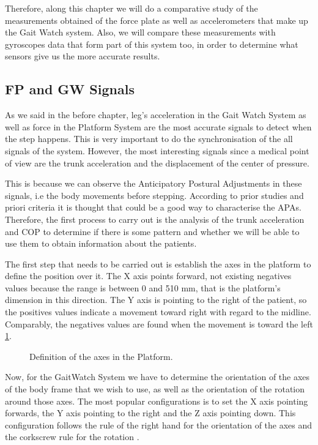 Therefore, along this chapter we will do a comparative study of the measurements obtained of the force plate as well as accelerometers that make up the Gait Watch system. Also, we will compare these measurements with gyroscopes data that form part of this system too, in order to determine what sensors give us the more accurate results.

\subsection{FP and GW Signals}
As we said in the before chapter, leg's acceleration in the Gait Watch System as well as force in the Platform System are the most accurate signals to detect when the step happens. This is very important to do the synchronisation of the all signals of the system. However, the most interesting signals since a medical point of view are the trunk acceleration and the displacement of the center of pressure.

This is because we can observe the Anticipatory Postural Adjustments in these signals, i.e the body movements before stepping. According to prior studies and priori criteria it is thought that could be a good way to characterise the APAs.
Therefore, the first process to carry out is the analysis of the trunk acceleration and COP to determine if there is some pattern and whether we will be able to use them to obtain information about the patients.

The first step that needs to be carried out is establish the axes in the platform to define the position over it. The X axis points forward, not existing negatives values because the range is between 0 and 510 mm, that is the platform’s dimension in this direction. The Y axis is pointing to the right of the patient, so the positives values indicate a movement toward right with regard to the midline. Comparably, the negatives values are found when the movement is toward the left \ref{fig:axesFP}.
\begin{figure}[H]
	\centering
	\caption{Definition of the axes in the Platform.}
	\label{fig:axesFP}
\end{figure}
Now, for the GaitWatch System we have to determine the orientation of the axes of the body frame that we wish to use, as well as the orientation of the rotation around those axes. The most popular configurations is to set the X axis pointing forwards, the Y axis pointing to the right and the Z axis pointing down. This configuration follows the rule of the right hand for the orientation of the axes and the corkscrew rule for the rotation \cite{OlivaresBotzel2013}. 

